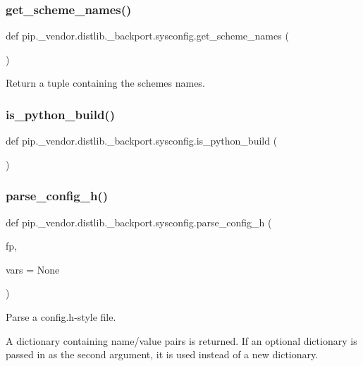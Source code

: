 \subsubsection{\texorpdfstring{get\+\_\+scheme\+\_\+names()}{get\_scheme\_names()}}
{\footnotesize\ttfamily def pip.\+\_\+vendor.\+distlib.\+\_\+backport.\+sysconfig.\+get\+\_\+scheme\+\_\+names (\begin{DoxyParamCaption}{ }\end{DoxyParamCaption})}

\begin{DoxyVerb}Return a tuple containing the schemes names.\end{DoxyVerb}
 \mbox{\label{namespacepip_1_1__vendor_1_1distlib_1_1__backport_1_1sysconfig_a3a51e461f6287a6ab28211301d3de8d0}} 
\subsubsection{\texorpdfstring{is\+\_\+python\+\_\+build()}{is\_python\_build()}}
{\footnotesize\ttfamily def pip.\+\_\+vendor.\+distlib.\+\_\+backport.\+sysconfig.\+is\+\_\+python\+\_\+build (\begin{DoxyParamCaption}{ }\end{DoxyParamCaption})}

\mbox{\label{namespacepip_1_1__vendor_1_1distlib_1_1__backport_1_1sysconfig_a5a3a37061ec2d9b2ff8ce688ef2a31b7}} 
\subsubsection{\texorpdfstring{parse\+\_\+config\+\_\+h()}{parse\_config\_h()}}
{\footnotesize\ttfamily def pip.\+\_\+vendor.\+distlib.\+\_\+backport.\+sysconfig.\+parse\+\_\+config\+\_\+h (\begin{DoxyParamCaption}\item[{}]{fp,  }\item[{}]{vars = {\ttfamily None} }\end{DoxyParamCaption})}

\begin{DoxyVerb}Parse a config.h-style file.

A dictionary containing name/value pairs is returned.  If an
optional dictionary is passed in as the second argument, it is
used instead of a new dictionary.
\end{DoxyVerb}
 